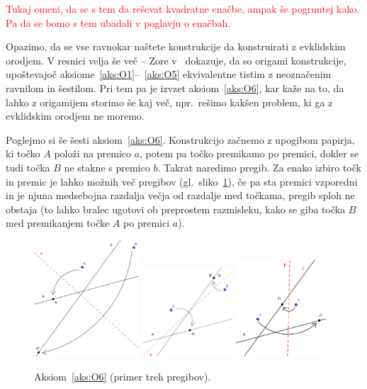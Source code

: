 \textcolor{red}{Tukaj omeni, da se s tem da reševat kvadratne enačbe, ampak še pogruntej kako. Pa da se bomo s tem ubadali v poglavju o enačbah.}

Opazimo, da se vse ravnokar naštete konstrukcije da konstruirati z evklidskim orodjem. V resnici velja še več -- Zore v~\cite{zore2022} dokazuje, da so origami konstrukcije, upoštevajoč aksiome~\ref{aks:O1}--~\ref{aks:O5} ekvivalentne tistim z neoznačenim ravnilom in šestilom. Pri tem pa je izvzet aksiom~\ref{aks:O6}, kar kaže na to, da lahko z origamijem storimo še kaj več, npr.\ rešimo kakšen problem, ki ga z evklidskim orodjem ne moremo.

Poglejmo si še šesti aksiom~\ref{aks:O6}. Konstrukcijo začnemo z upogibom papirja, ki točko $A$ položi na premico $a$, potem pa točko premikamo po premici, dokler se tudi točka $B$ ne stakne s premico $b$. Takrat naredimo pregib. Za enako izbiro točk in premic je lahko možnih več pregibov (gl.\ sliko~\ref{fig:O6}), če pa sta premici vzporedni in je njuna medsebojna razdalja večja od razdalje med točkama, pregib sploh ne obstaja (to lahko bralec ugotovi ob preprostem razmisleku, kako se giba točka $B$ med premikanjem točke $A$ po premici $a$).

\begin{figure}[h]
    \centering
    \includegraphics[width=0.35\textwidth]{images/origami_aksiomi/O6b.png}
    \includegraphics[width=0.3\textwidth]{images/origami_aksiomi/O6a.png}
    \includegraphics[width=0.3\textwidth]{images/origami_aksiomi/O6c.png}
    \caption[Aksiom~\ref{aks:O6}]{Aksiom~\ref{aks:O6} (primer treh pregibov).}
    \label{fig:O6}
\end{figure}

